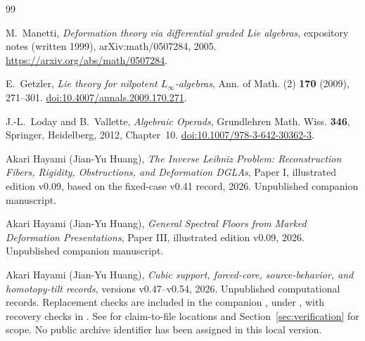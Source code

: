 \documentclass[11pt]{amsart}
\begin{document}
\clearpage
\begin{thebibliography}{99}
\raggedright

M.~Manetti,
\emph{Deformation theory via differential graded Lie algebras},
expository notes (written 1999), arXiv:math/0507284, 2005.
\url{https://arxiv.org/abs/math/0507284}.

E.~Getzler,
\emph{Lie theory for nilpotent $L_\infty$-algebras},
Ann. of Math. (2) \textbf{170} (2009), 271--301.
\href{https://doi.org/10.4007/annals.2009.170.271}{doi:10.4007/annals.2009.170.271}.

J.-L.~Loday and B.~Vallette,
\emph{Algebraic Operads}, Grundlehren Math. Wiss. \textbf{346},
Springer, Heidelberg, 2012, Chapter~10.
\href{https://doi.org/10.1007/978-3-642-30362-3}{doi:10.1007/978-3-642-30362-3}.

Akari Hayami (Jian-Yu Huang),
\emph{The Inverse Leibniz Problem: Reconstruction Fibers, Rigidity, Obstructions, and Deformation DGLAs},
Paper I, illustrated edition v0.09, based on the fixed-case v0.41 record, 2026.
Unpublished companion manuscript.

Akari Hayami (Jian-Yu Huang),
\emph{General Spectral Floors from Marked Deformation Presentations},
Paper III, illustrated edition v0.09, 2026. Unpublished companion manuscript.

Akari Hayami (Jian-Yu Huang),
\emph{Cubic support, forced-core, source-behavior, and homotopy-tilt records},
versions v0.47--v0.54, 2026. Unpublished computational records.
Replacement checks are included in the companion
, under
, with recovery checks in
.
See  for claim-to-file locations and
Section~\ref{sec:verification} for scope. No public archive identifier
has been assigned in this local version.
\end{thebibliography}
\end{document}
